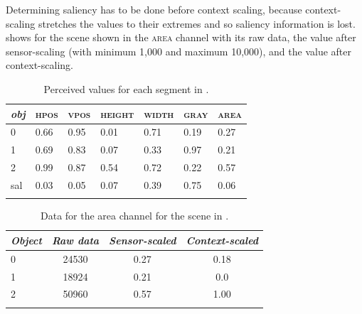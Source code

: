 Determining saliency has to be done before context scaling, because
context-scaling stretches the values to their extremes and so 
saliency information is lost. 
 shows for the scene shown in
 the \textsc{area} channel with its
raw data, the value after 
sensor-scaling (with minimum 1,000 and maximum 
10,000), and the value after context-scaling. 

\begin{table}[b]
\begin{center}
\begin{tabular}{  l   l   l   l   l   l   l  }
\lsptoprule
{\itshape obj} & \textsc{hpos} & \textsc{vpos} & \textsc{height} & \textsc{width} & \textsc{gray} & \textsc{area} \\ \midrule
0 & 0.66 & 0.95 & 0.01 & 0.71 & 0.19 & 0.27\\ 
1 & 0.69 & 0.83 & 0.07 & 0.33 & 0.97 & 0.21\\ 
2 & 0.99 & 0.87 & 0.54 & 0.72 & 0.22 & 0.57\\ 
sal & 0.03 & 0.05 & 0.07 & 0.39 & 0.75 & 0.06 \\ 
\lspbottomrule
\end{tabular}
\caption{Perceived values for each segment in .
\label{tab:rect1b}}
\end{center}
\end{table}

\begin{table}[t]
\begin{center}
\begin{tabular}{  l   c   c   c  } \lsptoprule
{\itshape Object} & {\itshape Raw data} & {\itshape Sensor-scaled} &  {\itshape Context-scaled} \\ \midrule
0 & 24530 & 0.27 & 0.18 \\ 
1 & 18924 & 0.21 & 0.0\\ 
2 & 50960 & 0.57 & 1.00 \\ 
\lspbottomrule
\end{tabular}
\caption{Data for the area channel for the scene in .
\label{tab:rect1b-area}}
\end{center}
\end{table}

